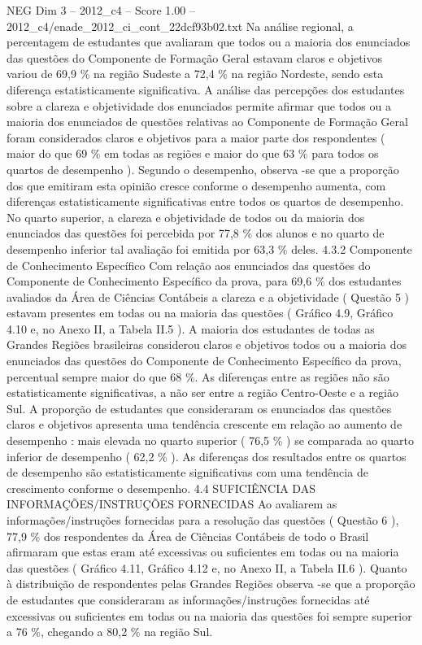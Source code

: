 \begin{textsample}{NEG Dim 3 – 2012\_c4 – Score 1.00 – 2012\_c4/enade\_2012\_ci\_cont\_22dcf93b02.txt}
Na análise regional, a percentagem de estudantes que avaliaram que todos ou a maioria dos enunciados das questões do Componente de Formação Geral estavam claros e objetivos variou de 69,9 \% na região Sudeste a 72,4 \% na região Nordeste, sendo esta diferença estatisticamente significativa.
A análise das percepções dos estudantes sobre a clareza e objetividade dos enunciados permite afirmar que todos ou a maioria dos enunciados de questões relativas ao Componente de Formação Geral foram considerados claros e objetivos para a maior parte dos respondentes ( maior do que 69 \% em todas as regiões e maior do que 63 \% para todos os quartos de desempenho ).
Segundo o desempenho, observa -se que a proporção dos que emitiram esta opinião cresce conforme o desempenho aumenta, com diferenças estatisticamente significativas entre todos os quartos de desempenho.
No quarto superior, a clareza e objetividade de todos ou da maioria dos enunciados das questões foi percebida por 77,8 \% dos alunos e no quarto de desempenho inferior tal avaliação foi emitida por 63,3 \% deles. 4.3.2 Componente de Conhecimento Específico Com relação aos enunciados das questões do Componente de Conhecimento Específico da prova, para 69,6 \% dos estudantes avaliados da Área de Ciências Contábeis a clareza e a objetividade ( Questão 5 ) estavam presentes em todas ou na maioria das questões ( Gráfico 4.9, Gráfico 4.10 e, no Anexo II, a Tabela II.5 ).
A maioria dos estudantes de todas as Grandes Regiões brasileiras considerou claros e objetivos todos ou a maioria dos enunciados das questões do Componente de Conhecimento Específico da prova, percentual sempre maior do que 68 \%.
As diferenças entre as regiões não são estatisticamente significativas, a não ser entre a região Centro-Oeste e a região Sul.
A proporção de estudantes que consideraram os enunciados das questões claros e objetivos apresenta uma tendência crescente em relação ao aumento de desempenho : mais elevada no quarto superior ( 76,5 \% ) se comparada ao quarto inferior de desempenho ( 62,2 \% ).
As diferenças dos resultados entre os quartos de desempenho são estatisticamente significativas com uma tendência de crescimento conforme o desempenho. 4.4 SUFICIÊNCIA DAS INFORMAÇÕES/INSTRUÇÕES FORNECIDAS Ao avaliarem as informações/instruções fornecidas para a resolução das questões ( Questão 6 ), 77,9 \% dos respondentes da Área de Ciências Contábeis de todo o Brasil afirmaram que estas eram até excessivas ou suficientes em todas ou na maioria das questões ( Gráfico 4.11, Gráfico 4.12 e, no Anexo II, a Tabela II.6 ).
Quanto à distribuição de respondentes pelas Grandes Regiões observa -se que a proporção de estudantes que consideraram as informações/instruções fornecidas até excessivas ou suficientes em todas ou na maioria das questões foi sempre superior a 76 \%, chegando a 80,2 \% na região Sul.

\end{textsample}
